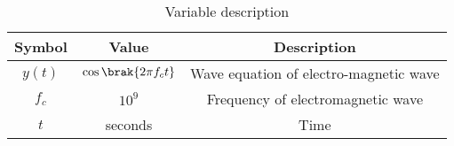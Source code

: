 \begin{table}[h]
    \centering
    \begin{tabular}{|c|c|c|}
    \hline
   Symbol&Value&Description\\ \hline
   $y(t)$&$\cos\brak{2{\pi}f_ct}$&Wave equation of electro-magnetic wave\\ \hline
   $f_c$&$10^9$&Frequency of electromagnetic wave\\ \hline
   $t$&seconds&Time\\ \hline

    \end{tabular}
    \caption{Variable description}
    \label{tab:12.8.6.1}
\end{table}
